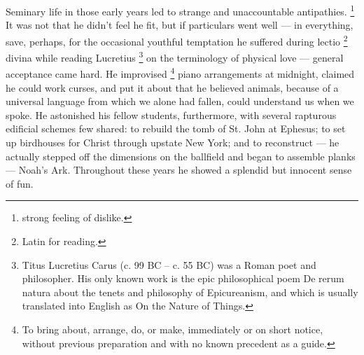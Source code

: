   Seminary life in those early years led to strange and unaccountable
antipathies. 
\footnote{strong feeling of dislike.}
It was not that he didn’t feel he fit, but if particulars went
well --- in everything, save, perhaps, for the occasional youthful temptation he
suffered during lectio 
\footnote{Latin for reading.}
divina while reading Lucretius 
\footnote{Titus Lucretius Carus (c. 99 BC – c. 55 BC) was
a Roman poet and philosopher. His only known work is the epic philosophical poem
De rerum natura about the tenets and philosophy of Epicureanism, and which is
usually translated into English as On the Nature of Things. 
}
on the terminology of
physical love --- general acceptance came hard. He improvised 
\footnote{To bring about, arrange, do, or make, immediately or on short notice,
without previous preparation and with no known precedent as a guide.
}
piano arrangements at
midnight, claimed he could work curses, and put it about that he believed
animals, because of a universal language from which we alone had fallen, could
understand us when we spoke. He astonished his fellow students, furthermore,
with several rapturous edificial schemes few shared: to rebuild the tomb of St.
John at Ephesus; 
to set up birdhouses for Christ through upstate New York; and
to reconstruct --- he actually stepped off the dimensions on the ballfield and began
to assemble planks --- Noah’s Ark. Throughout these years he showed a splendid but
innocent sense of fun.

